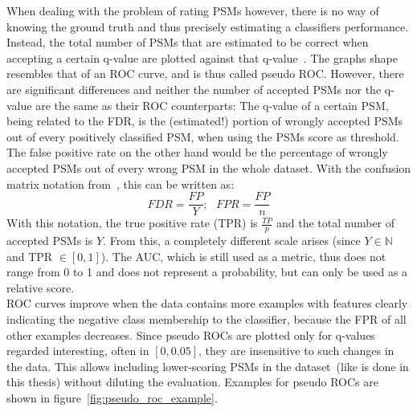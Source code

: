 	When dealing with the problem of rating PSMs however, there is no way of knowing the ground truth and thus precisely estimating a classifiers performance. Instead, the total number of PSMs that are estimated to be correct when accepting a certain q-value are plotted against that q-value~\cite{Kll2007, Granholm2012}. The graphs shape resembles that of an ROC curve, and is thus called pseudo ROC. However, there are significant differences and neither the number of accepted PSMs nor the q-value are the same as their ROC counterparts: The q-value of a certain PSM, being related to the FDR, is the (estimated!) portion of wrongly accepted PSMs out of every positively classified PSM, when using the PSMs score as threshold. The false positive rate on the other hand would be the percentage of wrongly accepted PSMs out of every wrong PSM in the whole dataset. With the confusion matrix notation from~\citet{Fawcett2006}, this can be written as:\\
	\begin{equation}
		FDR = \frac{FP}{Y};~~~ FPR = \frac{FP}{n}
	\end{equation}
	With this notation, the true positive rate (TPR) is $\frac{TP}{p}$ and the total number of accepted PSMs is $Y$. From this, a completely different scale arises (since $Y \in \mathbb{N}$ and TPR $\in [0,1]$). The AUC, which is still used as a metric, thus does not range from 0 to 1 and does not represent a probability, but can only be used as a relative score.\\
	ROC curves improve when the data contains more examples with features clearly indicating the negative class membership to the classifier, because the FPR of all other examples decreases. Since pseudo ROCs are plotted only for q-values regarded interesting, often in $[0,0.05]$, they are insensitive to such changes in the data. This allows including lower-scoring PSMs in the dataset~(like is done in this thesis) without diluting the evaluation. Examples for pseudo ROCs are shown in figure~\ref{fig:pseudo_roc_example}.
	\renewcommand{\baselinestretch}{0.9}
